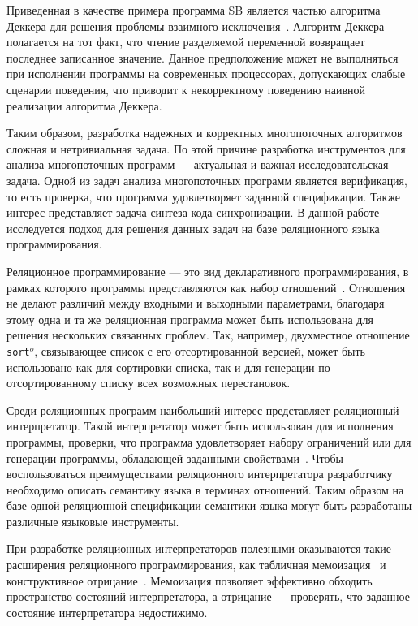 Приведенная в качестве примера программа SB является частью алгоритма Деккера 
для решения проблемы взаимного исключения~\cite{dijkstra1968cooperating}.
Алгоритм Деккера полагается на тот факт, 
что чтение разделяемой переменной возвращает последнее записанное значение.
Данное предположение может не выполняться 
при исполнении программы на современных процессорах, 
допускающих слабые сценарии поведения,
что приводит к некорректному поведению наивной реализации алгоритма Деккера.

Таким образом, разработка надежных и корректных 
многопоточных алгоритмов сложная и нетривиальная задача.
По этой причине разработка инструментов для анализа многопоточных программ --- 
актуальная и важная исследовательская задача.
Одной из задач анализа многопоточных программ является верификация,
то есть проверка, что программа удовлетворяет заданной спецификации.
Также интерес представляет задача синтеза кода синхронизации.
В данной работе исследуется подход для решения данных задач 
на базе реляционного языка программирования.

Реляционное программирование --- это вид декларативного программирования, 
в рамках которого программы представляются как набор отношений~\cite{byrd2009relational}.
Отношения не делают различий между входными и выходными параметрами,
благодаря этому одна и та же реляционная программа может быть использована
для решения нескольких связанных проблем. 
Так, например, двухместное отношение \texttt{sort$^o$}, связывающее список 
с его отсортированной версией, может быть использовано как для сортировки списка, 
так и для генерации по отсортированному списку всех возможных перестановок.

Среди реляционных программ наибольший интерес представляет реляционный интерпретатор.
Такой интерпретатор может быть использован для исполнения программы, 
проверки, что программа удовлетворяет набору ограничений
или для генерации программы, обладающей заданными свойствами~\cite{byrd2017unified}.
Чтобы воспользоваться преимуществами реляционного интерпретатора 
разработчику необходимо описать семантику языка в терминах отношений.
Таким образом на базе одной реляционной спецификации семантики языка
могут быть разработаны различные языковые инструменты. 

При разработке реляционных интерпретаторов полезными оказываются такие расширения 
реляционного программирования, как табличная мемоизация~\cite{swift2012xsb, schrijvers2008tchr}
и конструктивное отрицание~\cite{chan1988constructive, przymusinski1989constructive, stuckey1991constructive, liu1999constructive}.
Мемоизация позволяет эффективно обходить пространство состояний интерпретатора,
а отрицание --- проверять, что заданное состояние интерпретатора недостижимо.

